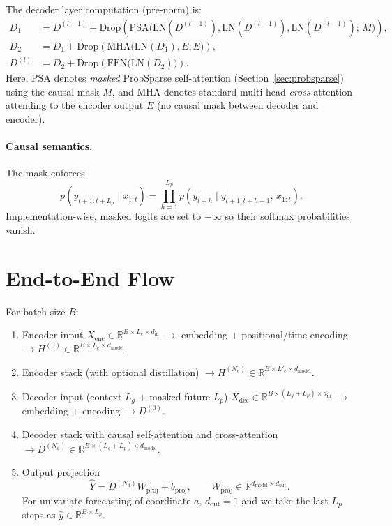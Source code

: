 \documentclass[11pt]{article}
\begin{document}
The decoder layer computation (pre-norm) is:
\begin{align}
D_1 &= D^{(l-1)} 
    + \mathrm{Drop}\!\left(
        \mathrm{PSA}\big(
            \mathrm{LN}(D^{(l-1)}),
            \mathrm{LN}(D^{(l-1)}),
            \mathrm{LN}(D^{(l-1)});\, M
        \big)
      \right),\\[4pt]
D_2 &= D_1 
    + \mathrm{Drop}\!\left(
        \mathrm{MHA}\big(
            \mathrm{LN}(D_1), 
            E, 
            E
        \big)
      \right),\\[4pt]
D^{(l)} &= D_2 
    + \mathrm{Drop}\!\left(
        \mathrm{FFN}\big(\mathrm{LN}(D_2)\big)
      \right).
\end{align}
Here, $\mathrm{PSA}$ denotes \emph{masked} ProbSparse self-attention (Section~\ref{sec:probsparse}) using the causal mask $M$, and $\mathrm{MHA}$ denotes standard multi-head \emph{cross}-attention attending to the encoder output $E$ (no causal mask between decoder and encoder).

\paragraph{Causal semantics.}
The mask enforces
\[
p(y_{t+1:t+L_p}\mid x_{1:t})
= \prod_{h=1}^{L_p} p(y_{t+h}\mid y_{t+1:t+h-1},\, x_{1:t}).
\]
Implementation-wise, masked logits are set to $-\infty$ so their softmax probabilities vanish.

\section{End-to-End Flow}

For batch size $B$:

\begin{enumerate}[leftmargin=2em]
\item Encoder input $X_{\text{enc}}\in\mathbb{R}^{B\times L_e\times d_{\text{in}}}$
$\to$ embedding + positional/time encoding
$\to H^{(0)}\in\mathbb{R}^{B\times L_e\times d_{\text{model}}}$.

\item Encoder stack (with optional distillation)
$\to H^{(N_e)}\in\mathbb{R}^{B\times L'_e\times d_{\text{model}}}$.

\item Decoder input (context $L_g$ + masked future $L_p$)
$X_{\text{dec}}\in\mathbb{R}^{B\times (L_g+L_p)\times d_{\text{in}}}$
$\to$ embedding + encoding $\to D^{(0)}$.

\item Decoder stack with causal self-attention and cross-attention
$\to D^{(N_d)}\in\mathbb{R}^{B\times (L_g+L_p)\times d_{\text{model}}}$.

\item Output projection
\[
\hat{Y} = D^{(N_d)} W_{\text{proj}} + b_{\text{proj}},
\qquad
W_{\text{proj}}\in\mathbb{R}^{d_{\text{model}}\times d_{\text{out}}}.
\]
For univariate forecasting of coordinate $a$, $d_{\text{out}}=1$ and we take the last $L_p$ steps as $\hat{y}\in\mathbb{R}^{B\times L_p}$.
\end{enumerate}
\end{document}
